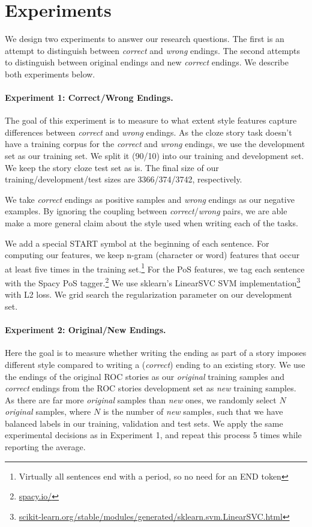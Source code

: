 \documentclass[11pt,a4paper]{article}
\newcommand{\isectionb}[1]{\section{#1}\label{ssec:#1}}
\begin{document}
\isectionb{Experiments}
We design two experiments to answer our research questions. 
The first is an attempt to distinguish between {\it correct} and {\it wrong} endings.
The second attempts to distinguish between original endings and new {\it correct} endings.
We describe both experiments below.

\paragraph{Experiment 1: Correct/Wrong Endings.}
The goal of this experiment is to measure to what extent  style features capture differences between {\it correct} and {\it wrong} endings.
As the cloze story task doesn't have a training corpus for the {\it correct} and {\it wrong} endings, we use the development set as our training set. 
We split it (90/10) into our training and development set. We keep the story cloze test set as is.
The final size of our training/development/test sizes are 3366/374/3742, respectively. 

We take  {\it correct} endings as positive samples and {\it wrong} endings as our negative examples. 
By ignoring the coupling between {\it correct}/{\it wrong} pairs, we are able make a more general claim about the style used when writing each of the tasks.

We add a special START symbol at the beginning of each sentence. 
For computing our features, we keep n-gram (character or word) features that occur at least five times in the training set.\footnote{Virtually all sentences end with a period, so no need for an END token}
For the PoS features, we tag each sentence with the Spacy PoS tagger.\footnote{\url{spacy.io/}}
We use  sklearn's LinearSVC SVM implementation\footnote{\url{scikit-learn.org/stable/modules/generated/sklearn.svm.LinearSVC.html}} 
with L2 loss. We grid search the regularization parameter on our development set. 

\paragraph{Experiment 2: Original/New Endings.}

Here the goal is to measure whether writing the ending as part of a story imposes different style compared to writing a ({\it correct}) ending to an existing story.
We use the endings of the original ROC stories as our {\it original} training samples and {\it correct} endings from the ROC stories development set as {\it new} training samples.
As there are far more {\it original} samples than {\it new} ones, we randomly select $N$ {\it original} samples, where $N$ is the number of {\it new} samples,
such that we have balanced labels in our training, validation and test sets.
We apply the same experimental decisions as in Experiment 1, and repeat this process 5 times while reporting the average.
\end{document}
